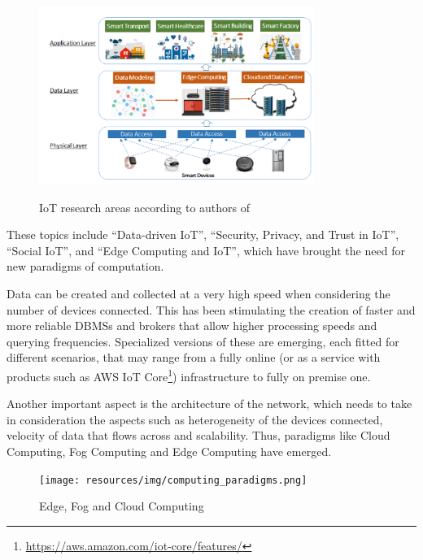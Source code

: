 		\begin{figure}[H]
			\centering
			\includegraphics[width=0.8\textwidth]{resources/img/iot_research_areas}\\
			\caption{IoT research areas according to authors of \cite{9319033}}
			\label{iot_research_areas}
		\end{figure}
	
		These topics include ``Data-driven IoT'', ``Security, Privacy, and Trust in IoT'', ``Social IoT'', and ``Edge Computing and IoT'', which have brought the need for new paradigms of computation.
		
		Data can be created and collected at a very high speed when considering the number of devices connected.
		This has been stimulating the creation of faster and more reliable DBMSs and brokers that allow higher processing speeds and querying frequencies.
		Specialized versions of these are emerging, each fitted for different scenarios, that may range from a fully online (or as a service with products such as AWS IoT Core\footnote{\url{https://aws.amazon.com/iot-core/features/}}) infrastructure to fully on premise one.
		
		Another important aspect is the architecture of the network, which needs to take in consideration the aspects such as heterogeneity of the devices connected, velocity of data that flows across and scalability.
		Thus, paradigms like Cloud Computing, Fog Computing and Edge Computing have emerged.
		
		\begin{figure}[H]
			\centering
			\texttt{[image: resources/img/computing\_paradigms.png]}\\
			\caption{Edge, Fog and Cloud Computing}
			\label{computing_paradigms}
		\end{figure}
	

